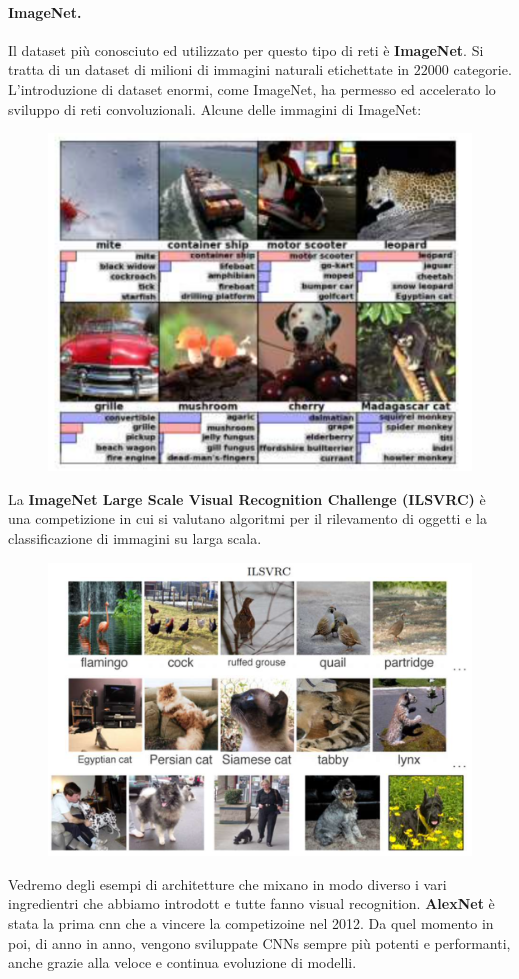 \paragraph{ImageNet.} Il dataset più conosciuto ed utilizzato per questo tipo di reti è \textbf{ImageNet}. Si tratta di un dataset di milioni di immagini naturali etichettate in $22000$ categorie. L'introduzione di dataset enormi, come ImageNet, ha permesso ed accelerato lo sviluppo di reti convoluzionali. Alcune delle immagini di ImageNet: 
\begin{figure}[!h]
    \includegraphics[scale=.5]{images/cnn/imagenet.png}
    \centering
\end{figure}


La \textbf{ImageNet Large Scale Visual Recognition Challenge (ILSVRC)} è una competizione in cui si valutano algoritmi per il rilevamento di oggetti e la classificazione di immagini su larga scala.
\begin{figure}[!h]
    \includegraphics[scale=.5]{images/cnn/ilsvrc.png}
    \centering
\end{figure}
Vedremo degli esempi di architetture che mixano in modo diverso i vari ingredientri che abbiamo introdott e tutte fanno visual recognition. \textbf{AlexNet} è stata la prima cnn che a vincere la competizoine nel 2012. Da quel momento in poi, di anno in anno, vengono sviluppate CNNs sempre più potenti e performanti, anche grazie alla veloce e continua evoluzione di modelli.
\newpage
